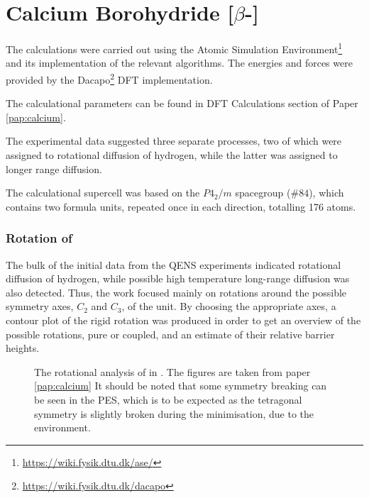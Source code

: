 \section{Calcium Borohydride [$\beta$-]}
\label{sec:borohydrides-calcium}

The calculations were carried out using the Atomic Simulation Environment\footnote{\url{https://wiki.fysik.dtu.dk/ase/}}~\cite{ase-2002} and its implementation of the relevant algorithms.
The energies and forces were provided by the Dacapo\footnote{\url{https://wiki.fysik.dtu.dk/dacapo}} DFT implementation.~\cite{dacapo-1999}

The calculational parameters can be found in DFT Calculations section of Paper \ref{pap:calcium}.

The experimental data suggested three separate processes, two of which were assigned to rotational diffusion of hydrogen, while the latter was assigned to longer range diffusion.

The calculational supercell was based on the $P4_2/m$ spacegroup ($\#84$), which contains two formula units, repeated once in each direction, totalling 176 atoms.

\subsubsection{Rotation of }
The bulk of the initial data from the QENS experiments indicated rotational diffusion of hydrogen, while possible high temperature long-range diffusion was also detected.
Thus, the work focused mainly on rotations around the possible symmetry axes, $C_2$ and $C_3$, of the  unit.
By choosing the appropriate axes, a contour plot of the rigid rotation was produced in order to get an overview of the possible rotations, pure or coupled, and an estimate of their relative barrier heights.

\begin{figure}[h]
\begin{center}
    \parbox{0.85\linewidth}{
      \caption{The rotational analysis of  in .
      The figures are taken from paper \ref{pap:calcium}
It should be noted that some symmetry breaking can be seen in the PES, which is to be expected as the tetragonal symmetry is slightly broken during the minimisation, due to the environment.
      }
      \label{fig:ca-rotational}
    }
\end{center}
\end{figure}

